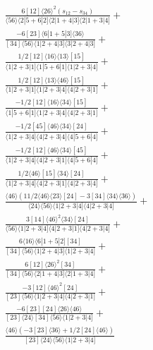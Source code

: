 \documentclass[varwidth, border=5pt]{standalone}
\begin{document}
\begin{my}
$\begin{gathered}
\scriptscriptstyle\frac{6[12]⟨26⟩^2(s_{12}-s_{34})}{⟨56⟩⟨2|5+6|2]⟨2|1+4|3]⟨2|1+3|4]}+\\
\scriptscriptstyle\frac{-6[23]⟨6|1+5|3]⟨36⟩}{[34]⟨56⟩⟨1|2+4|3]⟨3|2+4|3]}+\\
\scriptscriptstyle\frac{1/2[12]⟨16⟩⟨13⟩[15]}{⟨1|2+3|1]⟨1|5+6|1]⟨1|2+3|4]}+\\
\scriptscriptstyle\frac{1/2[12]⟨13⟩⟨46⟩[15]}{⟨1|2+3|1]⟨1|2+3|4]⟨4|2+3|1]}+\\
\scriptscriptstyle\frac{-1/2[12]⟨16⟩⟨34⟩[15]}{⟨1|5+6|1]⟨1|2+3|4]⟨4|2+3|1]}+\\
\scriptscriptstyle\frac{-1/2[45]⟨46⟩⟨34⟩[24]}{⟨1|2+3|4]⟨4|2+3|4]⟨4|5+6|4]}+\\
\scriptscriptstyle\frac{-1/2[12]⟨46⟩⟨34⟩[45]}{⟨1|2+3|4]⟨4|2+3|1]⟨4|5+6|4]}+\\
\scriptscriptstyle\frac{1/2⟨46⟩[15]⟨34⟩[24]}{⟨1|2+3|4]⟨4|2+3|1]⟨4|2+3|4]}+\\
\scriptscriptstyle\frac{⟨46⟩(11/2⟨46⟩⟨23⟩[24]-3[34]⟨34⟩⟨36⟩)}{⟨24⟩⟨56⟩⟨1|2+3|4]⟨4|2+3|4]}+\\
\scriptscriptstyle\frac{3[14]⟨46⟩^2⟨34⟩[24]}{⟨56⟩⟨1|2+3|4]⟨4|2+3|1]⟨4|2+3|4]}+\\
\scriptscriptstyle\frac{6⟨16⟩⟨6|1+5|2][34]}{[34]⟨56⟩⟨1|2+4|3]⟨1|2+3|4]}+\\
\scriptscriptstyle\frac{6[12]⟨26⟩^2[34]}{[34]⟨56⟩⟨2|1+4|3]⟨2|1+3|4]}+\\
\scriptscriptstyle\frac{-3[12]⟨46⟩^2[24]}{[23]⟨56⟩⟨1|2+3|4]⟨4|2+3|1]}+\\
\scriptscriptstyle\frac{-6[23][24]⟨26⟩⟨46⟩}{[23]⟨24⟩[34]⟨56⟩⟨1|2+3|4]}+\\
\scriptscriptstyle\frac{⟨46⟩(-3[23]⟨36⟩+1/2[24]⟨46⟩)}{[23]⟨24⟩⟨56⟩⟨1|2+3|4]}\phantom{+}
\end{gathered}$
\end{my}
\end{document}

